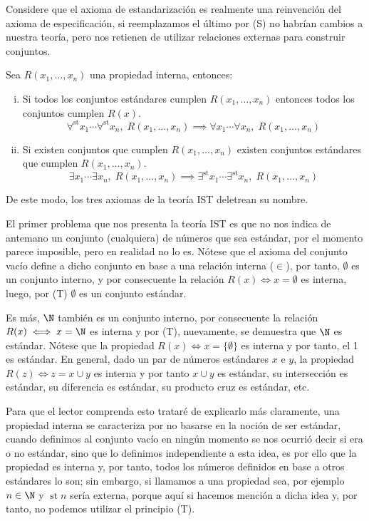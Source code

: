 \documentclass[11pt,oneside,a4paper]{book}
\DeclareMathOperator{\st}{st}
\newcommand{\existsst}{\exists^{\st}}
\newcommand{\forallst}{\forall^{\st}}
\begin{document}
Considere que el axioma de estandarización es realmente una reinvención del axioma de especificación, si reemplazamos el último por (S) no habrían cambios a nuestra teoría, pero nos retienen de utilizar relaciones externas para construir conjuntos.
\begin{axiom}[de Transferencia (T)]
Sea $R(x_1,\dots,x_n)$ una propiedad interna, entonces:
\begin{enumerate}[i)]
\item Si todos los conjuntos estándares cumplen $R(x_1,\dots,x_n)$ entonces todos los conjuntos cumplen $R(x)$.
$$\forallst x_1\cdots\forallst x_n,\;R(x_1,\dots,x_n)\implies\forall x_1\cdots\forall x_n,\;R(x_1,\dots,x_n)$$
\item Si existen conjuntos que cumplen $R(x_1,\dots,x_n)$ existen conjuntos estándares que cumplen $R(x_1,\dots,x_n)$.
$$\exists x_1\cdots\exists x_n,\;R(x_1,\dots,x_n)\implies\existsst x_1\cdots\existsst x_n,\;R(x_1,\dots,x_n)$$
\end{enumerate}
\end{axiom}
De este modo, los tres axiomas de la teoría IST deletrean su nombre.

El primer problema que nos presenta la teoría IST es que no nos indica de antemano un conjunto (cualquiera) de números que sea estándar, por el momento parece imposible, pero en realidad no lo es. Nótese que el axioma del conjunto vacío define a dicho conjunto en base a una relación interna ($\in$), por tanto, $\emptyset$ es un conjunto interno, y por consecuente la relación $R(x)\iff x=\emptyset$ es interna, luego, por (T) $\emptyset$ es un conjunto estándar.

Es más, $\N$ también es un conjunto interno, por consecuente la relación $R(x)\iff x=\N$ es interna y por (T), nuevamente, se demuestra que $\N$ es estándar. Nótese que la propiedad $R(x)\iff x=\{\emptyset\}$ es interna y por tanto, el 1 es estándar. En general, dado un par de números estándares $x$ e $y$, la propiedad $R(z)\iff z=x\cup y$ es interna y por tanto $x\cup y$ es estándar, su intersección es estándar, su diferencia es estándar, su producto cruz es estándar, etc.

Para que el lector comprenda esto trataré de explicarlo más claramente, una propiedad interna se caracteriza por no basarse en la noción de ser estándar, cuando definimos al conjunto vacío en ningún momento se nos ocurrió decir si era o no estándar, sino que lo definimos independiente a esta idea, es por ello que la propiedad es interna y, por tanto, todos los números definidos en base a otros estándares lo son; sin embargo, si llamamos a una propiedad sea, por ejemplo $n\in\N$ y $\st n$ sería externa, porque aquí si hacemos mención a dicha idea y, por tanto, no podemos utilizar el principio (T).
\end{document}

